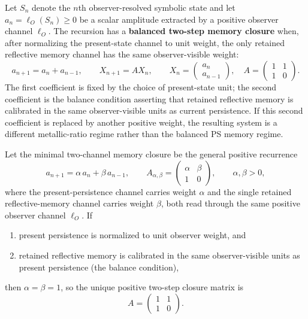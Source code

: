 \begin{definition}
\label{definition:bk5_balanced_two_step_memory_closure}
Let $S_n$ denote the $n$th observer-resolved symbolic state and let
$a_n=\ell_O(S_n)\geq 0$ be a scalar amplitude extracted by a positive
observer channel $\ell_O$.  The recursion has a \textbf{balanced two-step memory
closure} when, after normalizing the present-state channel to unit weight, the
only retained reflective memory channel has the same observer-visible weight:
\[
a_{n+1}=a_n+a_{n-1}, \qquad
X_{n+1}=A X_n,\qquad
X_n=\begin{pmatrix}a_n\\ a_{n-1}\end{pmatrix},\quad
A=\begin{pmatrix}1&1\\1&0\end{pmatrix}.
\]
The first coefficient is fixed by the choice of present-state unit; the second
coefficient is the balance condition asserting that retained reflective memory is
calibrated in the same observer-visible units as current persistence.  If this
second coefficient is replaced by another positive weight, the resulting system
is a different metallic-ratio regime rather than the balanced PS memory regime.
\end{definition}

\begin{lemma}
\label{lemma:bk5_balanced_observer_normalization}
Let the minimal two-channel memory closure be the general positive recurrence
\[
a_{n+1}=\alpha\,a_n+\beta\,a_{n-1},
\qquad
A_{\alpha,\beta}=\begin{pmatrix}\alpha&\beta\\1&0\end{pmatrix},
\qquad \alpha,\beta>0,
\]
where the present-persistence channel carries weight $\alpha$ and the single
retained reflective-memory channel carries weight $\beta$, both read through the
same positive observer channel $\ell_O$. If
\begin{enumerate}
\item present persistence is normalized to unit observer weight, and
\item retained reflective memory is calibrated in the same observer-visible
units as present persistence (the balance condition),
\end{enumerate}
then $\alpha=\beta=1$, so the unique positive two-step closure matrix is
\[
A=\begin{pmatrix}1&1\\1&0\end{pmatrix}.
\]
\end{lemma}

